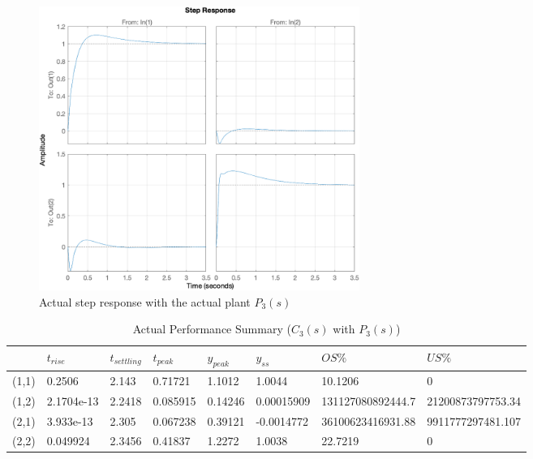 \documentclass{tron}
\begin{document}
\begin{figure}[H]
	\centering
	\includegraphics[height=350px]{../matlab/output/p5/Actual_step_response}
	\caption{Actual step response with the actual plant $P_{3}(s)$}
	\label{fig:p5:P3:step-response}
\end{figure}

\begin{table}[h!]
  \begin{center}
    \caption{Actual Performance Summary ($C_{3}(s)$ with $P_{3}(s)$)}
    \label{table:p5:perf:actual}
		\begin{tabular}{llllllll}
		& $t_{rise}$ & $t_{settling}$ & $t_{peak}$ & $y_{peak}$ & $y_{ss}$ & $OS\%$ & $US\%$ \\ 
		\hline 
		(1,1) & 0.2506 & 2.143 & 0.71721 & 1.1012 & 1.0044 & 10.1206 & 0 \\ 
		(1,2) & 2.1704e-13 & 2.2418 & 0.085915 & 0.14246 & 0.00015909 & 131127080892444.7 & 21200873797753.34 \\ 
		(2,1) & 3.933e-13 & 2.305 & 0.067238 & 0.39121 & -0.0014772 & 36100623416931.88 & 9911777297481.107 \\ 
		(2,2) & 0.049924 & 2.3456 & 0.41837 & 1.2272 & 1.0038 & 22.7219 & 0 \\ 
		\hline 
		\end{tabular}
  \end{center}
\end{table}
\end{document}
